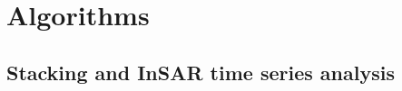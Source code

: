 
\section{Algorithms}



\subsection{Stacking and InSAR time series analysis}
\label{sec:ch4-method-compare}

